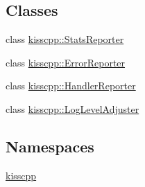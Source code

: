 \subsection*{Classes}
\begin{DoxyCompactItemize}
\item 
class \hyperlink{a00043}{kisscpp\-::\-Stats\-Reporter}
\item 
class \hyperlink{a00023}{kisscpp\-::\-Error\-Reporter}
\item 
class \hyperlink{a00027}{kisscpp\-::\-Handler\-Reporter}
\item 
class \hyperlink{a00030}{kisscpp\-::\-Log\-Level\-Adjuster}
\end{DoxyCompactItemize}
\subsection*{Namespaces}
\begin{DoxyCompactItemize}
\item 
\hyperlink{a00089}{kisscpp}
\end{DoxyCompactItemize}
